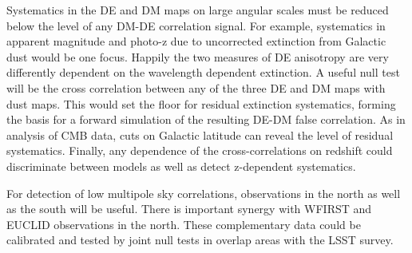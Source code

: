 Systematics in the DE and DM maps on large angular scales must be reduced below the level of any DM-DE correlation signal.  
For example, systematics in apparent magnitude and photo-z due to uncorrected extinction from Galactic dust would be one focus. 
Happily the two measures of DE anisotropy are very differently dependent on the wavelength dependent extinction. 
A useful null test will be the cross correlation between any of the three DE and DM maps with dust maps.  
This would set the floor for residual extinction systematics, forming the basis for a forward simulation of the resulting DE-DM false correlation. 
As in analysis of CMB data, cuts on Galactic latitude can reveal the level of residual systematics. 
Finally, any dependence of the cross-correlations on redshift could discriminate between models as well as detect z-dependent systematics.

For detection of low multipole sky correlations, observations in the north as well as the south will be useful.
There is important synergy with WFIRST and EUCLID observations in the north.  
These complementary data could be calibrated and tested by joint null tests in overlap areas with the LSST survey.

